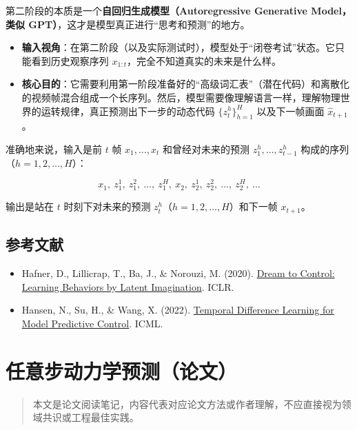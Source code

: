 第二阶段的本质是一个\textbf{自回归生成模型（Autoregressive Generative Model，类似 GPT）}，这才是模型真正进行``思考和预测''的地方。

\begin{itemize}
\tightlist
\item
  \textbf{输入视角}：在第二阶段（以及实际测试时），模型处于``闭卷考试''状态。它只能看到历史观察序列 \(x_{1:t}\)，完全不知道真实的未来是什么样。
\item
  \textbf{核心目的}：它需要利用第一阶段准备好的``高级词汇表''（潜在代码）和离散化的视频帧混合组成一个长序列。然后，模型需要像理解语言一样，理解物理世界的运转规律，真正预测出下一步的动态代码 \(\{z_t^h\}_{h=1}^H\) 以及下一帧画面 \(\hat{x}_{t+1}\)。
\end{itemize}

准确地来说，输入是前 \(t\) 帧 \(x_1,\ldots,x_t\) 和曾经对未来的预测 \(z_1^h,\ldots,z_{t-1}^h\) 构成的序列（\(h=1,2,\ldots,H\)）：

\[
x_1,\ z_1^1,\ z_1^2,\ \ldots,\ z_1^H,\ x_2,\ z_2^1,\ z_2^2,\ \ldots,\ z_2^H,\ \ldots
\]

输出是站在 \(t\) 时刻下对未来的预测 \(z_t^h\)（\(h=1,2,\ldots,H\)）和下一帧 \(x_{t+1}\)。

\hypertarget{ux53c2ux8003ux6587ux732e-189}{%
\subsection{参考文献}\label{ux53c2ux8003ux6587ux732e-189}}

\begin{itemize}
\tightlist
\item
  Hafner, D., Lillicrap, T., Ba, J., \& Norouzi, M. (2020). \href{https://arxiv.org/abs/1912.01603}{Dream to Control: Learning Behaviors by Latent Imagination}. ICLR.
\item
  Hansen, N., Su, H., \& Wang, X. (2022). \href{https://arxiv.org/abs/2203.04955}{Temporal Difference Learning for Model Predictive Control}. ICML.
\end{itemize}

\clearpage

\hypertarget{ux4efbux610fux6b65ux52a8ux529bux5b66ux9884ux6d4bux8bbaux6587}{%
\section{任意步动力学预测（论文）}\label{ux4efbux610fux6b65ux52a8ux529bux5b66ux9884ux6d4bux8bbaux6587}}

\begin{quote}
本文是论文阅读笔记，内容代表对应论文方法或作者理解，不应直接视为领域共识或工程最佳实践。
\end{quote}

